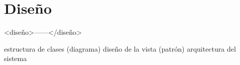 \chapter{Diseño}
\label{chap:diseño}

<diseño>------</diseño>

estructura de clases (diagrama)
diseño de la vista (patrón)
arquitectura del sistema 
